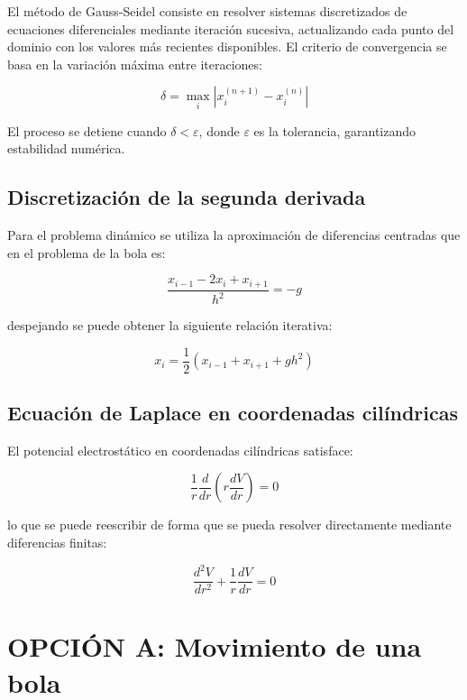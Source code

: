 \documentclass[12pt]{article}
\begin{document}
El método de Gauss-Seidel consiste en resolver sistemas discretizados de ecuaciones diferenciales mediante iteración sucesiva, actualizando cada punto del dominio con los valores más recientes disponibles. El criterio de convergencia se basa en la variación máxima entre iteraciones:

\begin{equation}
\delta = \max_i |x_i^{(n+1)} - x_i^{(n)}|
\end{equation}

El proceso se detiene cuando $\delta < \varepsilon$, donde $\varepsilon$ es la tolerancia, garantizando estabilidad numérica.

\subsection{Discretización de la segunda derivada}

Para el problema dinámico se utiliza la aproximación de diferencias centradas que en el problema de la bola es:

\begin{equation}
\frac{x_{i-1} - 2x_i + x_{i+1}}{h^2} = -g
\end{equation}

despejando se puede obtener la siguiente relación iterativa:

\begin{equation}
x_i = \frac{1}{2}\left(x_{i-1} + x_{i+1} + g h^2 \right)
\label{iter_A}
\end{equation}

\subsection{Ecuación de Laplace en coordenadas cilíndricas}

El potencial electrostático en coordenadas cilíndricas satisface:

\begin{equation}
\frac{1}{r}\frac{d}{dr}\left(r \frac{dV}{dr}\right) = 0
\end{equation}

lo que se puede reescribir de forma que se pueda resolver directamente mediante diferencias finitas:

\begin{equation}
\frac{d^2 V}{dr^2} + \frac{1}{r}\frac{dV}{dr} = 0
\label{laplace}
\end{equation}

\section{OPCIÓN A: Movimiento de una bola}
\end{document}
